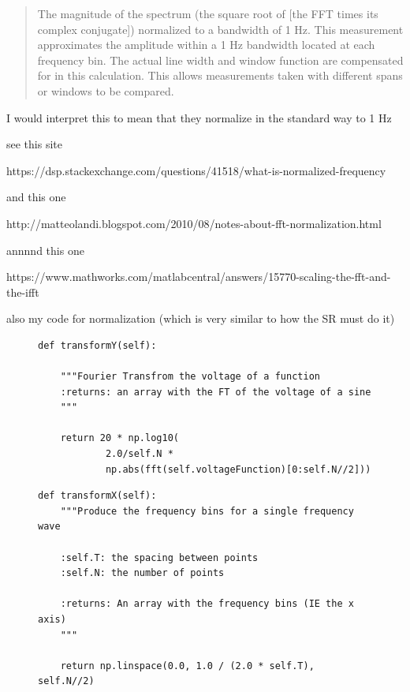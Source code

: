 \documentclass{article}
\begin{document}
\begin{quote}
The magnitude of the spectrum (the square root of [the FFT times its
complex conjugate]) normalized to a bandwidth of 1 Hz. This measurement
approximates the amplitude within a 1 Hz bandwidth located at each
frequency bin. The actual line width and window function are compensated for
in this calculation. This allows measurements taken with different spans or
windows to be compared.
\end{quote}

I would interpret this to mean that they normalize in the standard way to 1 Hz

see this site

https://dsp.stackexchange.com/questions/41518/what-is-normalized-frequency

and this one

http://matteolandi.blogspot.com/2010/08/notes-about-fft-normalization.html

annnnd this one

https://www.mathworks.com/matlabcentral/answers/15770-scaling-the-fft-and-the-ifft

also my code for normalization (which is very similar to how the SR must do it)
\begin{figure}[H]
\centering
\begin{minipage}{1\textwidth}
\begin{tcolorbox}
\begin{verbatim}
def transformY(self):

    """Fourier Transfrom the voltage of a function
    :returns: an array with the FT of the voltage of a sine
    """

    return 20 * np.log10(
            2.0/self.N *
            np.abs(fft(self.voltageFunction)[0:self.N//2]))
\end{verbatim}
\end{tcolorbox}
\end{minipage}
\end{figure}

\begin{figure}[H]
\centering
\begin{minipage}{1\textwidth}
\begin{tcolorbox}
\begin{verbatim}
def transformX(self):
    """Produce the frequency bins for a single frequency wave

    :self.T: the spacing between points
    :self.N: the number of points

    :returns: An array with the frequency bins (IE the x axis)
    """

    return np.linspace(0.0, 1.0 / (2.0 * self.T), self.N//2)
\end{verbatim}
\end{tcolorbox}
\end{minipage}
\end{figure}
\end{document}
